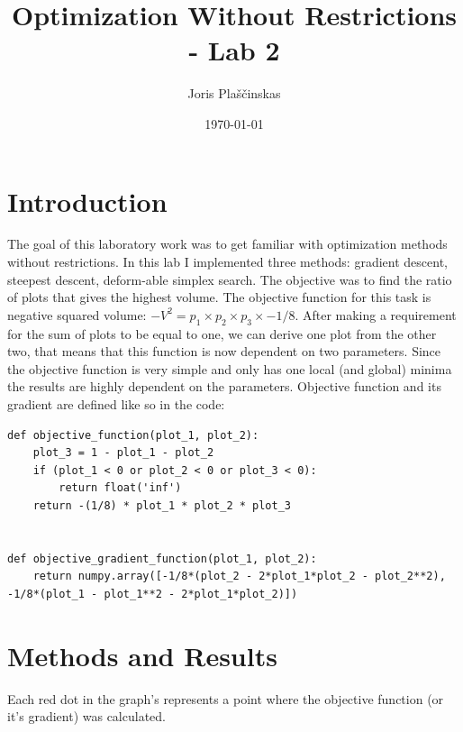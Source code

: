 \documentclass{article}
\title{Optimization Without Restrictions - Lab 2}
\author{Joris Plaščinskas}
\date{\today}
\begin{document}
    \maketitle
    \section*{Introduction}
        The goal of this laboratory work was to get familiar with optimization methods without restrictions. In this lab I implemented three methods: gradient descent, steepest descent, deform-able simplex search. The objective was to find the ratio of plots that gives the highest volume. The objective function for this task is negative squared volume: $-V^2 = p_1 \times p_2 \times p_3 \times -1/8$. After making a requirement for the sum of plots to be equal to one, we can derive one plot from the other two, that means that this function is now dependent on two parameters. Since the objective function is very simple and only has one local (and global) minima the results are highly dependent on the parameters. Objective function and its gradient are defined like so in the code:
        \begin{verbatim}
def objective_function(plot_1, plot_2):
    plot_3 = 1 - plot_1 - plot_2
    if (plot_1 < 0 or plot_2 < 0 or plot_3 < 0):
        return float('inf')
    return -(1/8) * plot_1 * plot_2 * plot_3


def objective_gradient_function(plot_1, plot_2):
    return numpy.array([-1/8*(plot_2 - 2*plot_1*plot_2 - plot_2**2), -1/8*(plot_1 - plot_1**2 - 2*plot_1*plot_2)])
        \end{verbatim}
    \section*{Methods and Results}
    Each red dot in the graph's represents a point where the objective function (or it's gradient) was calculated.
\end{document}
